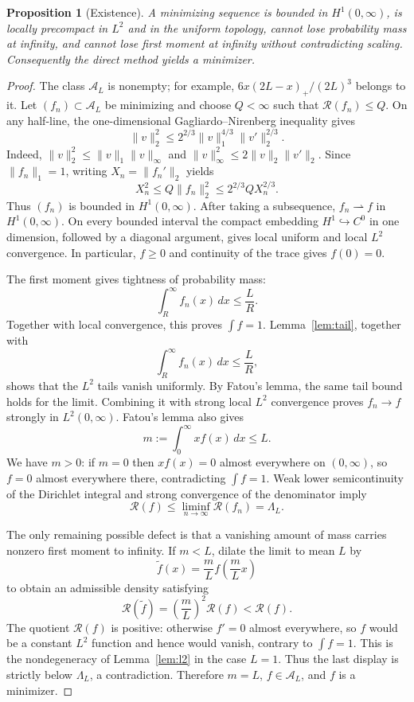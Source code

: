 \documentclass[11pt]{amsart}
\newtheorem{proposition}[theorem]{Proposition}
\theoremstyle{definition}
\theoremstyle{remark}
\newcommand{\A}{\mathcal A}
\newcommand{\Rcal}{\mathcal R}
\begin{document}
\begin{proposition}[Existence]\label{prop:existence}
\leavevmode\newline
A minimizing sequence is bounded in $H^1(0,\infty)$, is locally precompact in $L^2$ and in the uniform topology, cannot lose probability mass at infinity, and cannot lose first moment at infinity without contradicting scaling. Consequently the direct method yields a minimizer.
\end{proposition}
\begin{proof}
The class $\A_L$ is nonempty; for example,
$6x(2L-x)_+/(2L)^3$ belongs to it. Let $(f_n)\subset\A_L$ be minimizing
and choose $Q<\infty$ such that $\Rcal(f_n)\leq Q$. On any half-line,
the one-dimensional Gagliardo--Nirenberg inequality gives
\begin{equation}\label{eq:gn}
 \|v\|_2^2
 \leq 2^{2/3}\|v\|_1^{4/3}\|v'\|_2^{2/3}.
\end{equation}
Indeed, $\|v\|_2^2\leq\|v\|_1\|v\|_\infty$ and
$\|v\|_\infty^2\leq2\|v\|_2\|v'\|_2$. Since $\|f_n\|_1=1$, writing $X_n=\|f_n'\|_2$ yields
\[
 X_n^2\leq Q\|f_n\|_2^2
 \leq 2^{2/3}QX_n^{2/3}.
\]
Thus $(f_n)$ is bounded in $H^1(0,\infty)$. After taking a subsequence,
$f_n\rightharpoonup f$ in $H^1(0,\infty)$. On every bounded interval the
compact embedding $H^1\hookrightarrow C^0$ in one dimension, followed by a
diagonal argument, gives local uniform and local $L^2$ convergence. In
particular, $f\geq0$ and continuity of the trace gives $f(0)=0$.

The first moment gives tightness of probability mass:
\[
 \int_R^\infty f_n(x)\,dx\leq\frac{L}{R}.
\]
Together with local convergence, this proves $\int f=1$. Lemma~\ref{lem:tail}, together with
\[
 \int_R^\infty f_n(x)\,dx\leq\frac{L}{R},
\]
shows that the $L^2$ tails vanish uniformly. By Fatou's lemma, the same tail bound holds for the limit. Combining it with strong local $L^2$ convergence proves
$f_n\to f$ strongly in $L^2(0,\infty)$. Fatou's lemma also gives
\[
 m:=\int_0^\infty xf(x)\,dx\leq L.
\]
We have $m>0$: if $m=0$ then $xf(x)=0$ almost everywhere on $(0,\infty)$, so
$f=0$ almost everywhere there, contradicting $\int f=1$. Weak lower semicontinuity of the
Dirichlet integral and strong convergence of the denominator imply
\[
 \Rcal(f)\leq\liminf_{n\to\infty}\Rcal(f_n)=\Lambda_L.
\]

The only remaining possible defect is that a vanishing amount of mass carries nonzero first moment to infinity. If $m<L$, dilate the limit to mean $L$ by
\[
 \widetilde f(x)=\frac{m}{L}f\!\left(\frac{m}{L}x\right)
\]
to obtain an admissible density satisfying
\[
 \Rcal(\widetilde f)=\left(\frac{m}{L}\right)^2\Rcal(f)<\Rcal(f).
\]
The quotient $\Rcal(f)$ is positive: otherwise $f'=0$ almost everywhere, so
$f$ would be a constant $L^2$ function and hence would vanish, contrary to
$\int f=1$. This is the nondegeneracy of
Lemma~\ref{lem:l2} in the case $L=1$. Thus the last display is strictly below $\Lambda_L$, a
contradiction. Therefore $m=L$, $f\in\A_L$, and $f$ is a minimizer.
\end{proof}
\end{document}
